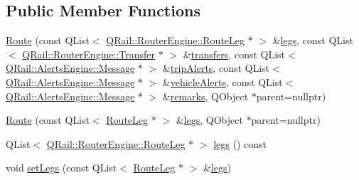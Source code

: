 \subsection*{Public Member Functions}
\begin{DoxyCompactItemize}
\item 
\mbox{\hyperlink{classQRail_1_1RouterEngine_1_1Route_a5063644c4df5409194b773a140189005}{Route}} (const Q\+List$<$ \mbox{\hyperlink{classQRail_1_1RouterEngine_1_1RouteLeg}{Q\+Rail\+::\+Router\+Engine\+::\+Route\+Leg}} $\ast$ $>$ \&\mbox{\hyperlink{classQRail_1_1RouterEngine_1_1Route_aeddeb0a07487274ecae67b4a9aef0701}{legs}}, const Q\+List$<$ \mbox{\hyperlink{classQRail_1_1RouterEngine_1_1Transfer}{Q\+Rail\+::\+Router\+Engine\+::\+Transfer}} $\ast$ $>$ \&\mbox{\hyperlink{classQRail_1_1RouterEngine_1_1Route_a67674768d1b895227e8fe64d1b3f4e1f}{transfers}}, const Q\+List$<$ \mbox{\hyperlink{classQRail_1_1AlertsEngine_1_1Message}{Q\+Rail\+::\+Alerts\+Engine\+::\+Message}} $\ast$ $>$ \&\mbox{\hyperlink{classQRail_1_1RouterEngine_1_1Route_ae304c1e025a25cce45d6bbf51d0c8308}{trip\+Alerts}}, const Q\+List$<$ \mbox{\hyperlink{classQRail_1_1AlertsEngine_1_1Message}{Q\+Rail\+::\+Alerts\+Engine\+::\+Message}} $\ast$ $>$ \&\mbox{\hyperlink{classQRail_1_1RouterEngine_1_1Route_a8cc828d45bd8711e59197002f3881f90}{vehicle\+Alerts}}, const Q\+List$<$ \mbox{\hyperlink{classQRail_1_1AlertsEngine_1_1Message}{Q\+Rail\+::\+Alerts\+Engine\+::\+Message}} $\ast$ $>$ \&\mbox{\hyperlink{classQRail_1_1RouterEngine_1_1Route_acf7c65a4556fa8bdccff820dd8f8acfd}{remarks}}, Q\+Object $\ast$parent=nullptr)
\item 
\mbox{\hyperlink{classQRail_1_1RouterEngine_1_1Route_a1a97cacc398b14f41b9c755b492b6b35}{Route}} (const Q\+List$<$ \mbox{\hyperlink{classQRail_1_1RouterEngine_1_1RouteLeg}{Route\+Leg}} $\ast$ $>$ \&\mbox{\hyperlink{classQRail_1_1RouterEngine_1_1Route_aeddeb0a07487274ecae67b4a9aef0701}{legs}}, Q\+Object $\ast$parent=nullptr)
\item 
Q\+List$<$ \mbox{\hyperlink{classQRail_1_1RouterEngine_1_1RouteLeg}{Q\+Rail\+::\+Router\+Engine\+::\+Route\+Leg}} $\ast$ $>$ \mbox{\hyperlink{classQRail_1_1RouterEngine_1_1Route_aeddeb0a07487274ecae67b4a9aef0701}{legs}} () const
\item 
void \mbox{\hyperlink{classQRail_1_1RouterEngine_1_1Route_af472483ea371f0b6a0fc88c1ea303a49}{set\+Legs}} (const Q\+List$<$ \mbox{\hyperlink{classQRail_1_1RouterEngine_1_1RouteLeg}{Route\+Leg}} $\ast$ $>$ \&\mbox{\hyperlink{classQRail_1_1RouterEngine_1_1Route_aeddeb0a07487274ecae67b4a9aef0701}{legs}})
\item 

\end{DoxyCompactItemize}
